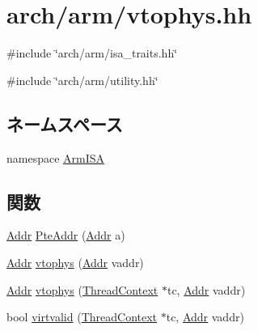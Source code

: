 \hypertarget{arm_2vtophys_8hh}{
\section{arch/arm/vtophys.hh}
\label{arm_2vtophys_8hh}
}
{\ttfamily \#include \char`\"{}arch/arm/isa\_\-traits.hh\char`\"{}}\par
{\ttfamily \#include \char`\"{}arch/arm/utility.hh\char`\"{}}\par
\subsection*{ネームスペース}
\begin{DoxyCompactItemize}
\item 
namespace \hyperlink{namespaceArmISA}{ArmISA}
\end{DoxyCompactItemize}
\subsection*{関数}
\begin{DoxyCompactItemize}
\item 
\hyperlink{classm5_1_1params_1_1Addr}{Addr} \hyperlink{namespaceArmISA_a70891b952f128e8e59bdf1d974dcb020}{PteAddr} (\hyperlink{classm5_1_1params_1_1Addr}{Addr} a)
\item 
\hyperlink{classm5_1_1params_1_1Addr}{Addr} \hyperlink{namespaceArmISA_a3828815371ad2b0a1be60abdcb405cf9}{vtophys} (\hyperlink{classm5_1_1params_1_1Addr}{Addr} vaddr)
\item 
\hyperlink{classm5_1_1params_1_1Addr}{Addr} \hyperlink{namespaceArmISA_ad4bbbca3210dee66152520984c3aac6a}{vtophys} (\hyperlink{classThreadContext}{ThreadContext} $\ast$tc, \hyperlink{classm5_1_1params_1_1Addr}{Addr} vaddr)
\item 
bool \hyperlink{namespaceArmISA_adb9987e5879519237d20dab6e4c9aefe}{virtvalid} (\hyperlink{classThreadContext}{ThreadContext} $\ast$tc, \hyperlink{classm5_1_1params_1_1Addr}{Addr} vaddr)
\end{DoxyCompactItemize}
